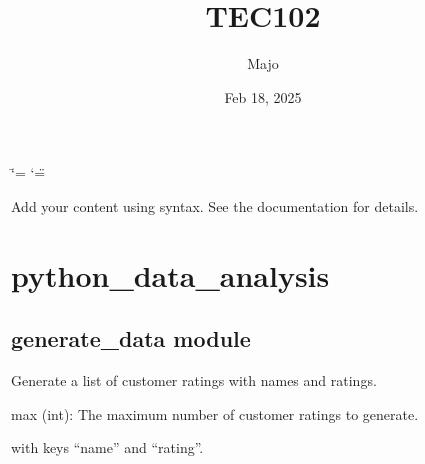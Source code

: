 \documentclass[letterpaper,10pt,english]{sphinxmanual}
\title{TEC102}
\date{Feb 18, 2025}
\author{Majo}
\begin{document}
\ifdefined\shorthandoff
  \ifnum\catcode`\=\string=\active\shorthandoff{=}\fi
  \ifnum\catcode`\"=\active{}\fi
\fi

\pagestyle{empty}
\sphinxmaketitle
\pagestyle{plain}
\sphinxtableofcontents
\pagestyle{normal}
\label{\detokenize{index::doc}}


\sphinxAtStartPar
Add your content using  syntax. See the
documentation for details.

\sphinxstepscope


\chapter{python\_data\_analysis}
\label{\detokenize{modules:python-data-analysis}}\label{\detokenize{modules::doc}}
\sphinxstepscope


\section{generate\_data module}
\label{\detokenize{generate_data:module-generate_data}}\label{\detokenize{generate_data:generate-data-module}}\label{\detokenize{generate_data::doc}}

\begin{fulllineitems}
\label{\detokenize{generate_data:generate_data.fake_customer_rating}}
\pysigstartsignatures
{}
\pysigstopsignatures
\sphinxAtStartPar
Generate a list of customer ratings with names and ratings.
\begin{description}
\sphinxAtStartPar
max (int): The maximum number of customer ratings to generate.

\begin{description}
\sphinxAtStartPar
with keys “name” and “rating”.

\end{description}

\end{description}

\end{fulllineitems}
\end{document}
